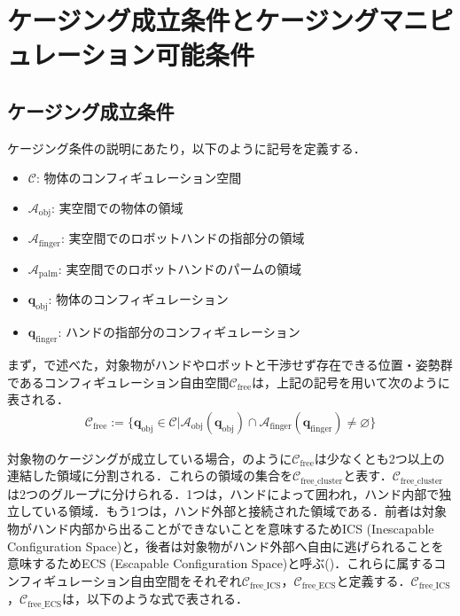 \documentclass[a4paper,twoside,12pt,papersize, dvipdfmx]{iirthesis}
\begin{document}
\section{ケージング成立条件とケージングマニピュレーション可能条件\cite{komiyama2021}}\label{sec::sicm::caging}
\subsection*{ケージング成立条件}
ケージング条件の説明にあたり，以下のように記号を定義する．
\begin{itemize}
\item $\mathcal{C}$: 物体のコンフィギュレーション空間
\item $\mathcal{A}_{\mathrm{obj}}$: 実空間での物体の領域
\item $\mathcal{A}_{\mathrm{finger}}$: 実空間でのロボットハンドの指部分の領域
\item $\mathcal{A}_{\mathrm{palm}}$: 実空間でのロボットハンドのパームの領域
\item $\bm{q}_{\mathrm{obj}}$: 物体のコンフィギュレーション
\item $\bm{q}_{\mathrm{finger}}$: ハンドの指部分のコンフィギュレーション
\end{itemize}

まず，で述べた，対象物がハンドやロボットと干渉せず存在できる位置・姿勢群であるコンフィギュレーション自由空間$\mathcal{C}_{\mathrm{free}}$は，上記の記号を用いて次のように表される．
\begin{gather}
\mathcal{C}_{\mathrm{free}} :=
\{\bm{q}_{\mathrm{obj}} \in \mathcal{C} | \mathcal{A}_{\mathrm{obj}}(\bm{q}_{\mathrm{obj}})
\cap \mathcal{A}_{\mathrm{finger}}(\bm{q}_{\mathrm{finger}}) \neq \varnothing\}
\label{eq::cfree}
\end{gather}

対象物のケージングが成立している場合，のように$\mathcal{C}_{\mathrm{free}}$は少なくとも2つ以上の連結した領域に分割される．これらの領域の集合を$\mathcal{C}_{\mathrm{free\_cluster}}$と表す．$\mathcal{C}_{\mathrm{free\_cluster}}$は2つのグループに分けられる．1つは，ハンドによって囲われ，ハンド内部で独立している領域．もう1つは，ハンド外部と接続された領域である．前者は対象物がハンド内部から出ることができないことを意味するためICS (Inescapable Configuration Space)と，後者は対象物がハンド外部へ自由に逃げられることを意味するためECS (Escapable Configuration Space)と呼ぶ()．これらに属するコンフィギュレーション自由空間をそれぞれ$\mathcal{C}_{\mathrm{free\_ICS}}$，$\mathcal{C}_{\mathrm{free\_ECS}}$と定義する．$\mathcal{C}_{\mathrm{free\_ICS}}$，$\mathcal{C}_{\mathrm{free\_ECS}}$は，以下のような式で表される．
\end{document}
